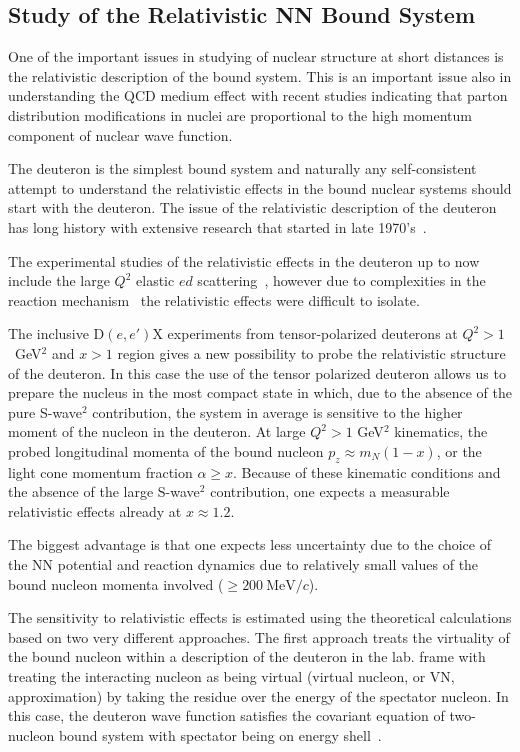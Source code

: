 \subsection{Study of the Relativistic NN Bound System}

One of the important issues in studying of nuclear structure  at short distances is the 
relativistic description of the bound system.  This is an important issue also in 
understanding the QCD medium effect with recent studies indicating that  parton distribution 
modifications  in nuclei are proportional to the high momentum component of nuclear wave function.

The deuteron is the simplest bound system and naturally any self-consistent attempt  to understand the 
relativistic effects in the bound nuclear systems  should start with the deuteron. 
The issue of the relativistic description of the deuteron has long history with extensive research that started in late 1970's~\cite{Gross:1982nz,Buck:1979ff,Frankfurt:1977vc,Frankfurt:1981mk}.

The experimental studies of the relativistic effects in the deuteron  up to now include the large $Q^2$ elastic 
$ed$ scattering~\cite{Alexa:1998fe}, however  
due to complexities  in the reaction mechanism~\cite{VanOrden:1995eg} the relativistic effects were 
difficult to isolate.

The inclusive D$(e,e')$X experiments from tensor-polarized deuterons at  $Q^2>1$~GeV$^2$ and $x>1$ region gives 
a new possibility to probe the relativistic structure of the deuteron.  In this case the use of the tensor polarized
deuteron allows us to prepare the nucleus in the most compact state in which, due to the absence of the 
pure S-wave$^2$ contribution, the system in average is sensitive to the higher moment of the nucleon in the deuteron.
At large $Q^2>1$ GeV$^2$ kinematics, the probed longitudinal momenta of the bound nucleon $p_z \approx m_N(1-x)$, 
or the light cone momentum fraction $\alpha \ge x$. Because of these kinematic conditions and the absence of the 
large S-wave$^2$ contribution, one expects a measurable relativistic effects already at $x\approx 1.2$.  

The biggest advantage is that one expects less uncertainty due to the choice of the NN potential  and reaction dynamics due to relatively small values of the bound nucleon momenta involved ($\ge 200~\mathrm{MeV}/c$).

The sensitivity to relativistic effects is estimated using the theoretical calculations based on two 
very different approaches.   The first approach treats the  virtuality of the bound nucleon within a
description of the deuteron in the lab. frame  with treating the interacting nucleon as being 
virtual (virtual nucleon, or VN, approximation) 
by taking the residue over the energy of the spectator nucleon.
In this case, the deuteron wave function satisfies the covariant equation of two-nucleon bound system 
with spectator being on energy shell~\cite{Sargsian:2009hf,Gross:2010qm}.

